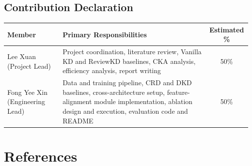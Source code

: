 \documentclass[11pt, letterpaper]{article}
\begin{document}
\subsection{Contribution Declaration}

\begin{center}
\begin{tabular}{lp{7cm}c}
\toprule
\textbf{Member} & \textbf{Primary Responsibilities} & \textbf{Estimated \%} \\
\midrule
Lee Xuan (Project Lead) & Project coordination, literature review, Vanilla KD and ReviewKD baselines, CKA analysis, efficiency analysis, report writing & 50\% \\
Fong Yee Xin (Engineering Lead) & Data and training pipeline, CRD and DKD baselines, cross-architecture setup, feature-alignment module implementation, ablation design and execution, evaluation code and README & 50\% \\
\bottomrule
\end{tabular}
\end{center}

\section{References}
\end{document}
